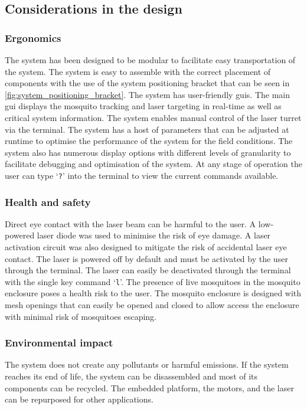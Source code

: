 \subsection{Considerations in the design}
\subsubsection{Ergonomics}
The system has been designed to be modular to facilitate easy transportation of the system. The system is easy to assemble with the correct placement of components with the use of the system positioning bracket that can be seen in \autoref{fig:system_positioning_bracket}. The system has user-friendly \glspl{gui}. The main \gls{gui} displays the mosquito tracking and laser targeting in real-time as well as critical system information. The system enables manual control of the laser turret via the terminal. The system has a host of parameters that can be adjusted at runtime to optimise the performance of the system for the field conditions. The system also has numerous display options with different levels of granularity to facilitate debugging and optimisation of the system. At any stage of operation the user can type `\texttt{?}' into the terminal to view the current commands available.

\subsubsection{Health and safety}
Direct eye contact with the laser beam can be harmful to the user. A low-powered laser diode was used to minimise the risk of eye damage. A laser activation circuit was also designed to mitigate the risk of accidental laser eye contact. The laser is powered off by default and must be activated by the user through the terminal. The laser can easily be deactivated through the terminal with the single key command `\texttt{l}'. The presence of live mosquitoes in the mosquito enclosure poses a health risk to the user. The mosquito enclosure is designed with mesh openings that can easily be opened and closed to allow access the enclosure with minimal risk of mosquitoes escaping.

\subsubsection{Environmental impact}
The system does not create any pollutants or harmful emissions. If the system reaches its end of life, the system can be disassembled and most of its components can be recycled. The embedded platform, the motors, and the laser can be repurposed for other applications.

